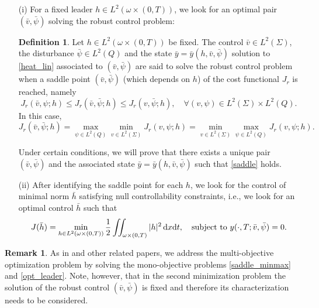 \documentclass{aims}
\theoremstyle{definition}
\newtheorem{definition}[theorem]{Definition}
\newtheorem{remark}{Remark}
\def\dx{\,\textnormal{d}x}
\def\dt{\textnormal{d}t}
\begin{document}
\begin{enumerate}
\item[(i)] For a fixed leader $h\in L^2(\omega\times(0,T))$, we look for an optimal pair $(\bar v,\bar \psi)$ solving the robust control problem:
%
\begin{definition}\label{defi_rob}
Let $h\in L^2(\omega\times(0,T))$ be fixed. The control $\bar v\in L^2(\Sigma)$, the disturbance $\bar \psi\in L^2(Q)$ and the state $\bar y=\bar y(h,\bar v,\bar \psi)$ solution to \eqref{heat_lin} associated to $(\bar v,\bar \psi)$ are said to solve the robust control problem when a saddle point $(\bar v,\bar \psi)$ (which depends on $h$) of the cost functional $J_r$ is reached, namely
%
\begin{equation}\label{saddle}
J_r(\bar v,\psi;h)\leq J_r(\bar v,\bar \psi;h)\leq J_r(v,\bar \psi;h), \quad \forall (v,\psi)\in L^2(\Sigma)\times L^2(Q).
\end{equation}
%
In this case,
%
\begin{equation}\label{saddle_minmax}
J_r(\bar v,\bar \psi;h)=\max_{\psi\in L^2(Q)}\min_{v\in L^2(\Sigma)}J_r(v,\psi;h)=\min_{v\in L^2(\Sigma)}\max_{\psi\in L^2(Q)}J_r(v,\psi;h).
\end{equation}
%
\end{definition} 
%
Under certain conditions, we will prove that there exists a unique pair $(\bar v,\bar \psi)$ and the associated state $\bar y=\bar y(h,\bar v,\bar\psi)$ such that \eqref{saddle} holds.
%
\item[(ii)] After identifying the saddle point for each $h$, we look for the control of minimal norm $\bar h$ satisfying null controllability constraints, i.e., we look for an optimal control $\bar h$  such that
%
\begin{equation}\label{opt_leader}
J(\bar h)=\min_{h\in L^2(\omega\times(0,T))}\frac{1}{2}\iint_{\omega\times(0,T)}|h|^2\dx\dt, \quad \text{subject to } y(\cdot,T;\bar v,\bar \psi)=0.
\end{equation}
\end{enumerate}

\begin{remark}
As in \cite{LionsSta} and other related papers, we address the multi-objective optimization problem by solving the mono-objective problems \eqref{saddle_minmax} and \eqref{opt_leader}. Note, however, that in the second minimization problem the solution of the robust control $(\bar v, \bar \psi)$ is fixed and therefore its characterization needs to be considered.
\end{remark}
\end{document}
